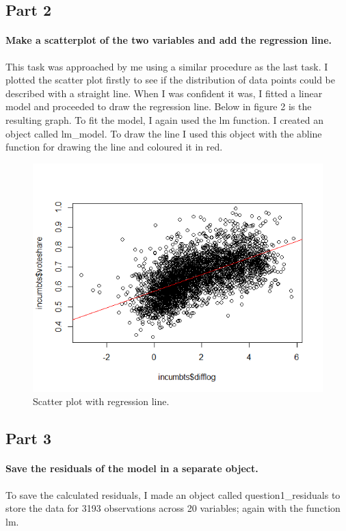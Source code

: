 \documentclass{article}
\begin{document}
 	\subsection{Part 2}
 	\paragraph{Make a scatterplot of the two variables and add the regression line.}
 	This task was approached by me using a similar procedure as the last task. I plotted the scatter plot firstly to see if the distribution of data points could be described with a straight line. 
 	When I was confident it was, I fitted a linear model and proceeded to draw the regression line. Below in figure 2 is the resulting graph. To fit the model, I again used the lm function. I created an object called lm\_model. To draw the line I used this object with the abline function for drawing the line and coloured it in red.
 	\begin{figure}[h!]
 	\centering
 		\includegraphics[width=0.9\linewidth]{Question1 - Scatter Plot.png}
 		\caption{Scatter plot with regression line.}
 		\label{fig:Scatter plot with line}
 	\end{figure}
 	 	\subsection{Part 3}
 	\paragraph{Save the residuals of the model in a separate object.}
 	To save the calculated residuals, I made an object called question1\_residuals to store the data for 3193 observations across 20 variables; again with the function lm. 
\end{document}
